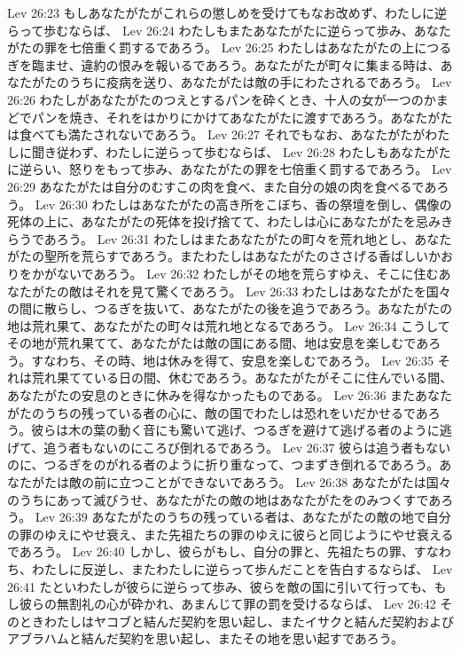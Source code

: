 Lev 26:23  もしあなたがたがこれらの懲しめを受けてもなお改めず、わたしに逆らって歩むならば、
Lev 26:24  わたしもまたあなたがたに逆らって歩み、あなたがたの罪を七倍重く罰するであろう。
Lev 26:25  わたしはあなたがたの上につるぎを臨ませ、違約の恨みを報いるであろう。あなたがたが町々に集まる時は、あなたがたのうちに疫病を送り、あなたがたは敵の手にわたされるであろう。
Lev 26:26  わたしがあなたがたのつえとするパンを砕くとき、十人の女が一つのかまどでパンを焼き、それをはかりにかけてあなたがたに渡すであろう。あなたがたは食べても満たされないであろう。
Lev 26:27  それでもなお、あなたがたがわたしに聞き従わず、わたしに逆らって歩むならば、
Lev 26:28  わたしもあなたがたに逆らい、怒りをもって歩み、あなたがたの罪を七倍重く罰するであろう。
Lev 26:29  あなたがたは自分のむすこの肉を食べ、また自分の娘の肉を食べるであろう。
Lev 26:30  わたしはあなたがたの高き所をこぼち、香の祭壇を倒し、偶像の死体の上に、あなたがたの死体を投げ捨てて、わたしは心にあなたがたを忌みきらうであろう。
Lev 26:31  わたしはまたあなたがたの町々を荒れ地とし、あなたがたの聖所を荒らすであろう。またわたしはあなたがたのささげる香ばしいかおりをかがないであろう。
Lev 26:32  わたしがその地を荒らすゆえ、そこに住むあなたがたの敵はそれを見て驚くであろう。
Lev 26:33  わたしはあなたがたを国々の間に散らし、つるぎを抜いて、あなたがたの後を追うであろう。あなたがたの地は荒れ果て、あなたがたの町々は荒れ地となるであろう。
Lev 26:34  こうしてその地が荒れ果てて、あなたがたは敵の国にある間、地は安息を楽しむであろう。すなわち、その時、地は休みを得て、安息を楽しむであろう。
Lev 26:35  それは荒れ果てている日の間、休むであろう。あなたがたがそこに住んでいる間、あなたがたの安息のときに休みを得なかったものである。
Lev 26:36  またあなたがたのうちの残っている者の心に、敵の国でわたしは恐れをいだかせるであろう。彼らは木の葉の動く音にも驚いて逃げ、つるぎを避けて逃げる者のように逃げて、追う者もないのにころび倒れるであろう。
Lev 26:37  彼らは追う者もないのに、つるぎをのがれる者のように折り重なって、つまずき倒れるであろう。あなたがたは敵の前に立つことができないであろう。
Lev 26:38  あなたがたは国々のうちにあって滅びうせ、あなたがたの敵の地はあなたがたをのみつくすであろう。
Lev 26:39  あなたがたのうちの残っている者は、あなたがたの敵の地で自分の罪のゆえにやせ衰え、また先祖たちの罪のゆえに彼らと同じようにやせ衰えるであろう。
Lev 26:40  しかし、彼らがもし、自分の罪と、先祖たちの罪、すなわち、わたしに反逆し、またわたしに逆らって歩んだことを告白するならば、
Lev 26:41  たといわたしが彼らに逆らって歩み、彼らを敵の国に引いて行っても、もし彼らの無割礼の心が砕かれ、あまんじて罪の罰を受けるならば、
Lev 26:42  そのときわたしはヤコブと結んだ契約を思い起し、またイサクと結んだ契約およびアブラハムと結んだ契約を思い起し、またその地を思い起すであろう。
